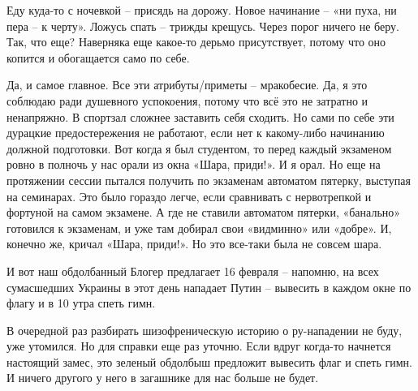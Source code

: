 Еду куда-то с ночевкой – присядь на дорожу. Новое начинание – «ни пуха, ни пера
– к черту». Ложусь спать – трижды крещусь. Через порог ничего не беру. Так, что
еще? Наверняка еще какое-то дерьмо присутствует, потому что оно копится и
обогащается само по себе.

Да, и самое главное. Все эти атрибуты/приметы – мракобесие. Да, я это соблюдаю
ради душевного успокоения, потому что всё это не затратно и ненапряжно. В
спортзал сложнее заставить себя сходить. Но сами по себе эти дурацкие
предостережения не работают, если нет к какому-либо начинанию должной
подготовки. Вот когда я был студентом, то перед каждый экзаменом ровно в
полночь у нас орали из окна «Шара, приди!». И я орал. Но еще на протяжении
сессии пытался получить по экзаменам автоматом пятерку, выступая на семинарах.
Это было гораздо легче, если сравнивать с нервотрепкой и фортуной на самом
экзамене. А где не ставили автоматом пятерки, «банально» готовился к экзаменам,
и уже там добирал свои «видминно» или «добре». И, конечно же, кричал «Шара,
приди!». Но это все-таки была не совсем шара.

И вот наш обдолбанный Блогер предлагает 16 февраля – напомню, на всех
сумасшедших Украины в этот день нападает Путин – вывесить в каждом окне по
флагу и в 10 утра спеть гимн.

В очередной раз разбирать шизофреническую историю о ру-нападении не буду, уже
утомился. Но для справки еще раз уточню. Если вдруг когда-то начнется настоящий
замес, это зеленый обдолбыш предложит вывесить флаг и спеть гимн. И ничего
другого у него в загашнике для нас больше не будет.
